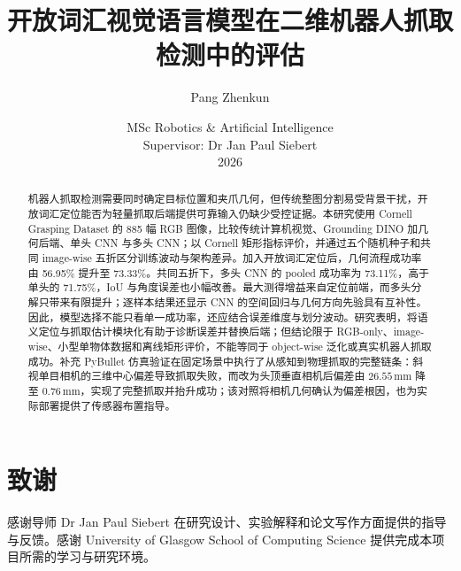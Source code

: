 \documentclass{l4proj}
\begin{document}
\renewcommand{\abstractname}{摘要}
\renewcommand{\contentsname}{目录}
\renewcommand{\figurename}{图}
\renewcommand{\tablename}{表}
\renewcommand{\bibname}{参考文献}
\renewcommand{\appendixname}{附录}

\title{开放词汇视觉语言模型在二维机器人抓取检测中的评估}
\author{Pang Zhenkun}
\date{MSc Robotics \& Artificial Intelligence\\Supervisor: Dr Jan Paul Siebert\\2026}

\maketitle

\begin{abstract}
机器人抓取检测需要同时确定目标位置和夹爪几何，但传统整图分割易受背景干扰，开放词汇定位能否为轻量抓取后端提供可靠输入仍缺少受控证据。本研究使用 Cornell Grasping Dataset 的 885 幅 RGB 图像，比较传统计算机视觉、Grounding DINO 加几何后端、单头 CNN 与多头 CNN；以 Cornell 矩形指标评价，并通过五个随机种子和共同 image-wise 五折区分训练波动与架构差异。加入开放词汇定位后，几何流程成功率由 56.95\% 提升至 73.33\%。共同五折下，多头 CNN 的 pooled 成功率为 73.11\%，高于单头的 71.75\%，IoU 与角度误差也小幅改善。最大测得增益来自定位前端，而多头分解只带来有限提升；逐样本结果还显示 CNN 的空间回归与几何方向先验具有互补性。因此，模型选择不能只看单一成功率，还应结合误差维度与划分波动。研究表明，将语义定位与抓取估计模块化有助于诊断误差并替换后端；但结论限于 RGB-only、image-wise、小型单物体数据和离线矩形评价，不能等同于 object-wise 泛化或真实机器人抓取成功。补充 PyBullet 仿真验证在固定场景中执行了从感知到物理抓取的完整链条：斜视单目相机的三维中心偏差导致抓取失败，而改为头顶垂直相机后偏差由 $26.55$\,mm 降至 $0.76$\,mm，实现了完整抓取并抬升成功；该对照将相机几何确认为偏差根因，也为实际部署提供了传感器布置指导。
\end{abstract}

\chapter*{致谢}
感谢导师 Dr Jan Paul Siebert 在研究设计、实验解释和论文写作方面提供的指导与反馈。感谢 University of Glasgow School of Computing Science 提供完成本项目所需的学习与研究环境。
\end{document}
